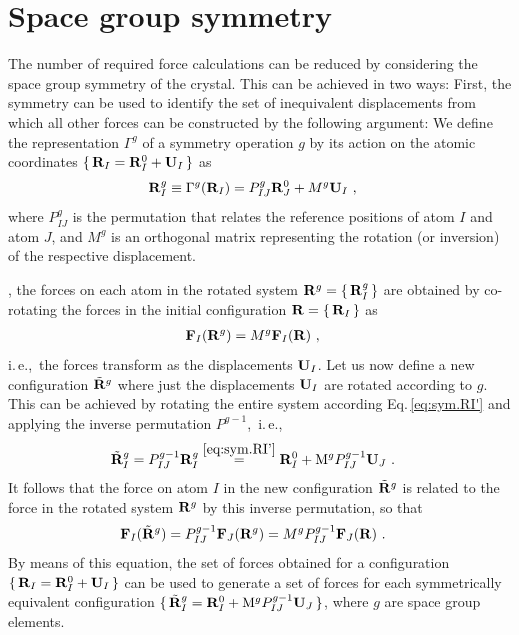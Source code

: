\section{Space group symmetry}
\label{sec:app.space-group-symmetry}
The number of required force calculations can be reduced by considering the space group symmetry of the crystal. This can be achieved in two ways: First, the symmetry can be used to identify the set of inequivalent displacements from which all other forces can be constructed by the following argument: We define the representation $\Gamma^g$ of a symmetry operation $g$ by its action on the atomic coordinates $\set{{\bf R}_I = {\bf R}_I^0 + {\bf U}_I}$ as
\begin{align}
\b R_I^{g} &\equiv {\Gamma}^g (\b R_I) = { P}^g_{IJ} \b R^0_J + { M}^g \b U_I~,
\label{eq:sym.RI'}
\end{align}	
where $P^g_{IJ}$ is the permutation that relates the reference positions of atom $I$ and atom $J$, and $M^g$ is an orthogonal matrix representing the rotation (or inversion) of the respective displacement.

, the forces on each atom in the rotated system ${\bf R}^g = \set{{\bf R}^g_I}$ are obtained by co-rotating the forces in the initial configuration ${\bf R} = \set{{\bf R}_I}$ as
\begin{align}
\b F_I (\b R^g) &= {M}^g \b F_I (\b R)~,
\label{eq:sym.Fp}
\end{align}
i.\,e.,~the forces transform as the displacements ${\bf U}_I$.
Let us now define a new configuration $\tilde{{\bf R}}^g$ where just the displacements ${\bf U}_I$ are rotated according to $g$. This can be achieved by rotating the entire system according Eq.\,\eqref{eq:sym.RI'} and applying the inverse permutation $P^{g-1}$,~i.\,e.,
\begin{align}
\tilde{{\bf R}}_I^g 
&= P^{g-1}_{IJ} {\bf R}_I^g 
\stackrel{\eqref{eq:sym.RI'}}{=} {\bf R}^0_I + {\rm M}^g P^{g-1}_{IJ} {\bf U}_J~.
\end{align}
It follows that the force on atom $I$ in the new configuration $\tilde{{\bf R}}^g$ is related to the force in the rotated system ${\bf R}^g$ by this inverse permutation, so that
\begin{align}
\b F_I (\tilde{\b R}^g) 
&= {P}^{g-1}_{IJ} \b F_J (\b R^g) 
= {M}^g  {P}^{g-1}_{IJ} \b F_J (\b R)~.
\label{eq:sym.Ftilde}
\end{align}
By means of this equation, the set of forces obtained for a configuration $\set{{\bf R}_I = {\bf R}_I^0 + {\bf U}_I}$ can be used to generate a set of forces for each symmetrically equivalent configuration $\set{\tilde{{\bf R}}_I^g = {\bf R}_I^0 + {\rm M}^g P^{g-1}_{IJ} {\bf U}_J}$, where $g$ are space group elements.

